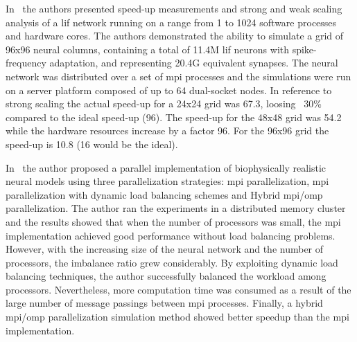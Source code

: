 \documentclass[11pt,a4paper]{article}
\begin{document}
In~\cite{Pastorelli2015ScalingT1} the authors presented speed-up measurements and strong and weak scaling analysis of a \gls{lif} network running on a range from 1 to 1024 software processes and hardware cores. The authors demonstrated the ability to simulate a grid of 96x96 neural columns, containing a total of 11.4M \gls{lif} neurons with spike-frequency adaptation, and representing 20.4G equivalent synapses. The neural network was distributed over a set of \gls{mpi} processes and the simulations were run on a server platform composed of up to 64 dual-socket nodes. In reference to strong scaling the actual speed-up for a 24x24 grid was 67.3, loosing ~30\% compared to the ideal speed-up (96). The speed-up for the 48x48 grid was 54.2 while the hardware resources increase by a factor 96. For the 96x96 grid the speed-up is 10.8 (16 would be the ideal).

In~\cite{hu2012biophysically} the author proposed a parallel implementation of biophysically realistic neural models using three parallelization strategies: \gls{mpi} parallelization, \gls{mpi} parallelization with dynamic load balancing schemes and Hybrid \gls{mpi}/\gls{omp} parallelization. The author ran the experiments in a distributed memory cluster and the results showed that when the number of processors was small, the \gls{mpi} implementation achieved good performance without load balancing problems. However, with the increasing size of the neural network and the number of processors, the imbalance ratio grew considerably. By exploiting dynamic load balancing techniques, the author successfully balanced the workload among processors. Nevertheless, more computation time was consumed as a result of the large number of message passings between \gls{mpi} processes. Finally, a hybrid \gls{mpi}/\gls{omp} parallelization simulation method showed better speedup than the \gls{mpi} implementation.



























\end{document}

